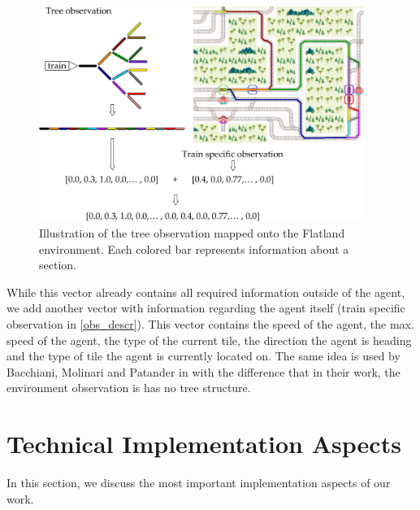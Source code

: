 \begin{figure}[H]
	\centering
	\includegraphics[width=300pt]{diagrams/tree_obs_mapping.pdf}
	\caption{Illustration of the tree observation mapped onto the Flatland environment. Each colored bar represents information about a section.}
	\label{fig:obs_descr}
\end{figure}
While this vector already contains all required information outside of the agent, we add another vector with information regarding the agent itself (train specific observation in \autoref{obs_descr}). This vector contains the speed of the agent, the max. speed of the agent, the type of the current tile, the direction the agent is heading and the type of tile the agent is currently located on. The same idea is used by Bacchiani, Molinari and Patander in \cite{marltraffica3c} with the difference that in their work, the environment observation is has no tree structure.
\newpage
\section{Technical Implementation Aspects}\label{software}
In this section, we discuss the most important implementation aspects of our work. 

